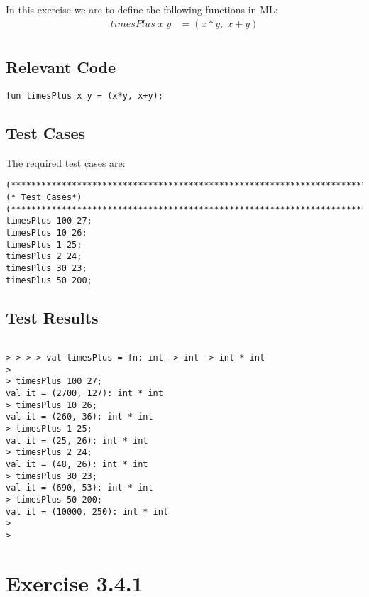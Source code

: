 \documentclass{report}
\begin{document}
In this exercise we are to define the following functions in ML:
\begin{align*}
 timesPlus\; x\; y &= (x*y,\; x+y)\\
\end{align*}

\section{Relevant Code}
\label{sec:relevant-code}

\lstset{frameround=tttt}
\begin{lstlisting}[frame=tRBL]
 fun timesPlus x y = (x*y, x+y);
\end{lstlisting}

\section{Test Cases}
\label{sec:test-cases}

The required test cases are:
\begin{lstlisting}[frame = tRBL ]
(****************************************************************************)
(* Test Cases*)
(****************************************************************************)
timesPlus 100 27;
timesPlus 10 26;
timesPlus 1 25;
timesPlus 2 24;
timesPlus 30 23;
timesPlus 50 200;
\end{lstlisting}


\section{Test Results}
\label{sec:test-results}

\setcounter{sessioncount}{0}
\begin{session}
  \begin{scriptsize}
\begin{verbatim}

> > > > val timesPlus = fn: int -> int -> int * int
> 
> timesPlus 100 27;
val it = (2700, 127): int * int
> timesPlus 10 26;
val it = (260, 36): int * int
> timesPlus 1 25;
val it = (25, 26): int * int
> timesPlus 2 24;
val it = (48, 26): int * int
> timesPlus 30 23;
val it = (690, 53): int * int
> timesPlus 50 200;
val it = (10000, 250): int * int
> 
>
\end{verbatim}    
  \end{scriptsize}
\end{session}


\chapter{Exercise 3.4.1}
\label{cha:exercise-3.4.1}
\end{document}
